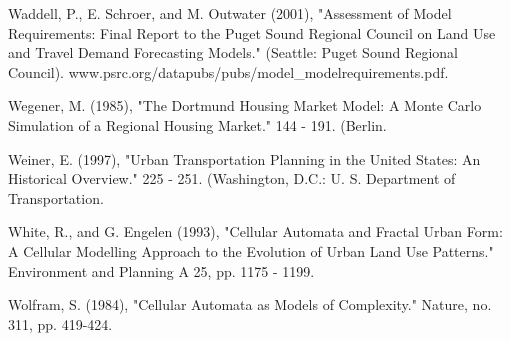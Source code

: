 Waddell, P., E. Schroer, and M. Outwater (2001), "Assessment of Model Requirements: Final Report to the Puget Sound Regional Council on Land Use and Travel Demand Forecasting Models." (Seattle: Puget Sound Regional Council). www.psrc.org/datapubs/pubs/model\_modelrequirements.pdf.

Wegener, M. (1985), "The Dortmund Housing Market Model: A Monte Carlo Simulation of a Regional Housing Market." 144 - 191. (Berlin.

Weiner, E. (1997), "Urban Transportation Planning in the United States: An Historical Overview." 225 - 251. (Washington, D.C.: U. S. Department of Transportation.

White, R., and G. Engelen (1993), "Cellular Automata and Fractal Urban Form: A Cellular Modelling Approach to the Evolution of Urban Land Use Patterns." Environment and Planning A 25, pp. 1175 - 1199.

Wolfram, S. (1984), "Cellular Automata as Models of Complexity." Nature, no. 311, pp. 419-424.
